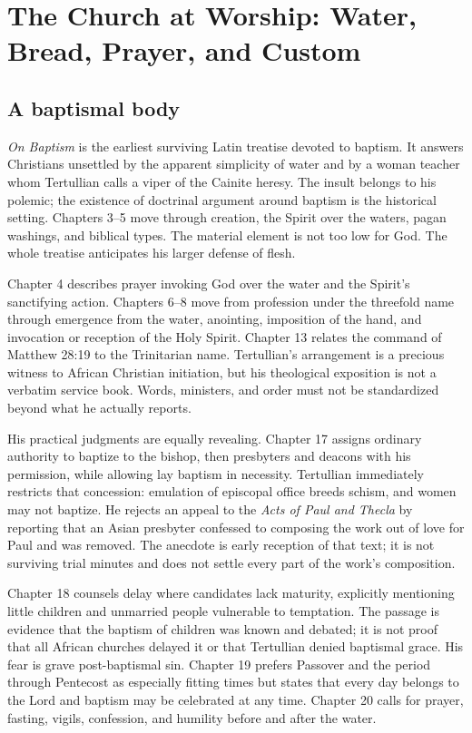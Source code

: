 \section{The Church at Worship: Water, Bread, Prayer, and Custom}

\subsection{A baptismal body}

\emph{On Baptism} is the earliest surviving Latin treatise devoted to baptism.
It answers Christians unsettled by the apparent simplicity of water and by a
woman teacher whom Tertullian calls a viper of the Cainite heresy. The insult
belongs to his polemic; the existence of doctrinal argument around baptism is
the historical setting. Chapters 3--5 move through creation, the Spirit over
the waters, pagan washings, and biblical types. The material element is not too
low for God. The whole treatise anticipates his larger defense of flesh.

Chapter 4 describes prayer invoking God over the water and the Spirit's
sanctifying action. Chapters 6--8 move from profession under the threefold name
through emergence from the water, anointing, imposition of the hand, and
invocation or reception of the Holy Spirit. Chapter 13 relates the command of
Matthew 28:19 to the Trinitarian name. Tertullian's arrangement is a precious
witness to African Christian initiation, but his theological exposition is not
a verbatim service book. Words, ministers, and order must not be standardized
beyond what he actually reports.

His practical judgments are equally revealing. Chapter 17 assigns ordinary
authority to baptize to the bishop, then presbyters and deacons with his
permission, while allowing lay baptism in necessity. Tertullian immediately
restricts that concession: emulation of episcopal office breeds schism, and
women may not baptize. He rejects an appeal to the \emph{Acts of Paul and
Thecla} by reporting that an Asian presbyter confessed to composing the work
out of love for Paul and was removed. The anecdote is early reception of that
text; it is not surviving trial minutes and does not settle every part of the
work's composition.

Chapter 18 counsels delay where candidates lack maturity, explicitly mentioning
little children and unmarried people vulnerable to temptation. The passage is
evidence that the baptism of children was known and debated; it is not proof
that all African churches delayed it or that Tertullian denied baptismal grace.
His fear is grave post-baptismal sin. Chapter 19 prefers Passover and the period
through Pentecost as especially fitting times but states that every day belongs
to the Lord and baptism may be celebrated at any time. Chapter 20 calls for
prayer, fasting, vigils, confession, and humility before and after the water.


